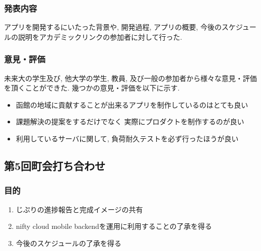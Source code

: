 \subsubsection{発表内容}
アプリを開発するにいたった背景や, 開発過程, アプリの概要, 今後のスケジュールの説明をアカデミックリンクの参加者に対して行った.
\subsubsection{意見・評価}
未来大の学生及び, 他大学の学生, 教員, 及び一般の参加者から様々な意見・評価を頂くことができた. 幾つかの意見・評価を以下に示す.
\begin{itemize}
    \item 函館の地域に貢献することが出来るアプリを制作しているのはとても良い
    \item 課題解決の提案をするだけでなく 実際にプロダクトを制作するのが良い
    \item 利用しているサーバに関して, 負荷耐久テストを必ず行ったほうが良い
\end{itemize}


\subsection{第5回町会打ち合わせ}
\subsubsection{目的}
\begin{enumerate}
    \item じぷりの進捗報告と完成イメージの共有
    \item nifty cloud mobile backendを運用に利用することの了承を得る
    \item 今後のスケジュールの了承を得る
\end{enumerate}

